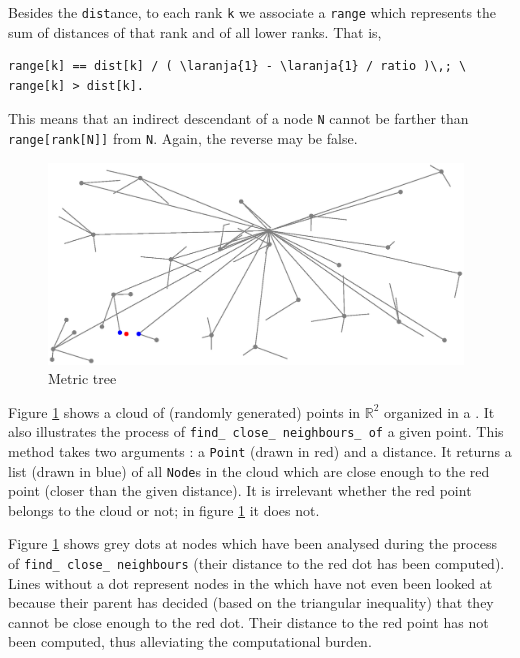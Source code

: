 Besides the {\small\tt dist}ance, to each rank {\small\tt k} we associate a {\small\tt range}
which represents the sum of distances of that rank and of all lower ranks.
That is,
\begin{Verbatim}[commandchars=\\\{\},formatcom=\small\tt,baselinestretch=0.94]
   range[k] == dist[k] / ( \laranja{1} - \laranja{1} / ratio )\,; \ range[k] > dist[k].
\end{Verbatim}
\noindent This means that an indirect descendant of a node {\small\tt N} cannot be farther than
{\small\tt range[rank[N]]} from {\small\tt N}.
Again, the reverse may be false.

\begin{figure}[ht] \centering
  \includegraphics[width=110mm]{metric-tree}
  \caption{Metric tree}
  \label{\numb section 11.\numb fig 3}
\end{figure}

Figure \ref{\numb section 11.\numb fig 3} shows a cloud of (randomly generated) points in
$ \mathbb{R}^2 $ organized in a {\small\tt{}}.
It also illustrates the process of {\small\tt find\_\,close\_\,neighbours\_\,of} a given point.
This method takes two arguments : a {\small\tt Point} (drawn in red) and a distance.
It returns a list (drawn in blue) of all {\small\tt Node}s in the cloud which are close enough
to the red point (closer than the given distance).
It is irrelevant whether the red point belongs to the cloud or not;
in figure \ref{\numb section 11.\numb fig 3} it does not.

Figure \ref{\numb section 11.\numb fig 3} shows grey dots at nodes which have been analysed
during the process of {\small\tt find\_\,close\_\,neighbours}
(their distance to the red dot has been computed).
Lines without a dot represent nodes in the {\small\tt{}} which have not even been
looked at because their parent has decided (based on the triangular inequality)
that they cannot be close enough to the red dot.
Their distance to the red point has not been computed, thus alleviating the computational
burden.

